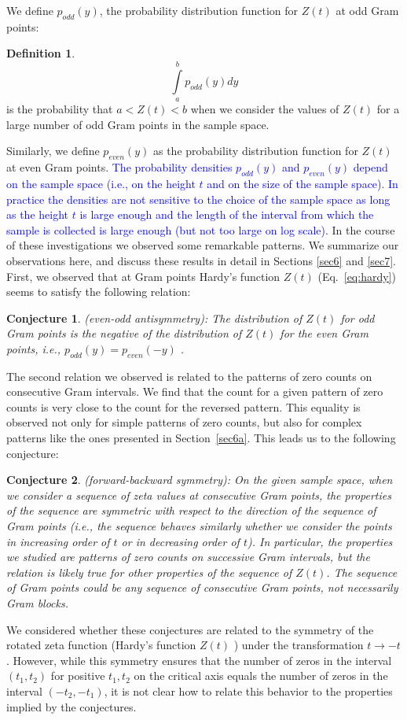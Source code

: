 \documentclass[twoside]{article}
\newtheorem{mydef}{Conjecture}
\theoremstyle{definition}
\newtheorem{defn}{Definition}
\begin{document}
 We define $p_{odd}(y)$, the probability distribution function for $Z(t)$ at odd Gram points:
\begin{defn}\label{podd}
\begin{equation}
\int\limits_{a}^{b} p_{odd}(y)dy
\label{eq:pdfodd}
\end{equation}
is the probability that $a<Z(t)<b$ when we consider the values of $Z(t)$ for a large number of odd Gram points in the sample space. 
\end{defn}
Similarly, we define $p_{even}(y)$ as the probability distribution function for $Z(t)$ at even Gram points. 
\textcolor{blue}{The probability densities $p_{odd}(y)$ and $p_{even}(y)$ depend on the sample space (i.e., on the height $t$ and on the size of the sample space). In practice the densities are not sensitive to the choice of the sample space as long as the height $t$ is large enough and the length of the interval from which the sample is collected is large enough (but not too large on log scale).} In the course of these investigations we observed some remarkable patterns. We summarize our observations here, and discuss these results in detail in Sections \ref{sec6} and \ref{sec7}.
First, we observed that at Gram points Hardy's function $Z(t)$ (Eq.~\ref{eq:hardy}) seems to satisfy the following relation:
  \begin{mydef}\label{antisymmetry}
(even-odd antisymmetry): The distribution of $Z(t)$ for odd Gram points is the negative of the distribution of $Z(t)$ for the even Gram points, i.e., $p_{odd}(y) = p_{even}(-y)$ .
\end{mydef}

The second relation we observed is related to the patterns of zero counts on consecutive Gram intervals.  We find that the count for
a given pattern of zero counts  is very close to the count for the reversed pattern. This equality is observed not only for simple patterns of zero counts, but also for complex patterns like the ones presented in Section~\ref{sec6a}. This leads us to the following conjecture:

 \begin{mydef}\label{symmetry}
(forward-backward symmetry): On the given sample space, when we consider a sequence of zeta values at consecutive Gram points, the properties of the sequence are symmetric with respect to the direction of the sequence of Gram points (i.e., the sequence behaves similarly whether we consider the points in increasing order of $t$ or in decreasing order of $t$).  In particular, the properties we studied are patterns of zero counts on successive Gram intervals, but the relation is likely true for other properties of the sequence of $Z(t)$. The sequence of Gram points could be any sequence of consecutive Gram points, not necessarily Gram blocks.
\end{mydef}
We considered whether these conjectures are related to the symmetry  of the rotated zeta function (Hardy's function $Z(t)$ ) under the transformation $t \rightarrow -t$. However, while this symmetry ensures that the number of zeros in the interval $(t_1, t_2)$ for positive $t_1, t_2$ on the critical axis equals the number of zeros in the interval $(-t_2, -t_1)$, it is not clear how to relate this behavior  to the properties implied by the conjectures.
\end{document}

